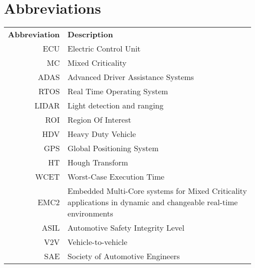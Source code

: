 \chapter*{Abbreviations}
\noindent{}\begin{tabular}{r  l}
\textbf{Abbreviation} 	& \textbf{Description} \vspace{.5em} \\
ECU		&Electric Control Unit\\
MC		&Mixed Criticality\\
ADAS	&Advanced Driver Assistance Systems\\
RTOS	&Real Time Operating System\\
LIDAR	&Light detection and ranging\\
ROI		&Region Of Interest\\
HDV		&Heavy Duty Vehicle\\
GPS		&Global Positioning System\\
HT		&Hough Transform\\
WCET	&Worst-Case Execution Time\\
EMC2	&Embedded Multi-Core systems for Mixed Criticality
applications in dynamic and changeable real-time
environments\\
ASIL	&Automotive Safety Integrity Level\\
V2V		&Vehicle-to-vehicle\\
SAE		&Society of Automotive Engineers\\
\end{tabular}
